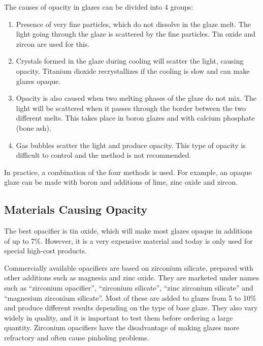 The causes of opacity in glazes can be divided into 4 groups:
\begin{enumerate}
\item Presence of very fine particles, which do not dissolve in the glaze melt. 
The light going through the glaze is scattered by the fine particles. Tin oxide 
 and zircon  are used for this.
\item Crystals formed in the glaze during cooling will scatter the light, 
causing opacity. Titanium dioxide  recrystallizes if the cooling is 
slow and can make glazes opaque.
\item Opacity is also caused when two melting phases of the glaze do not mix. 
The light will be scattered when it passes through the border between the two 
different melts. This takes place in boron glazes and with calcium phosphate 
(bone ash).
\item Gas bubbles scatter the light and produce opacity. This type of opacity 
is difficult to control and the method is not recommended.
\end{enumerate}
In practice, a combination of the four methods is used. For example, an opaque 
glaze can be made with boron and additions of lime, zinc oxide and zircon.
\subsection{Materials Causing Opacity}
The best opacifier is tin oxide, which will make most glazes opaque in 
additions of up to 7\%. However, it is a very expensive material and today is 
only used for special high-cost products.

Commercially available opacifiers are based on zirconium silicate, prepared 
with other additions such as magnesia and zinc oxide. They are marketed under 
names such as ``zirconium opacifier'', ``zirconium silicate'', ``zinc zirconium 
silicate'' and ``magnesium zirconium silicate''. Most of these are added to 
glazes 
from 5 to 10\% and produce different results depending on the type of base 
glaze. They also vary widely in quality, and it is important to test them 
before ordering a large quantity. Zirconium opacifiers have the disadvantage of 
making glazes more refractory and often cause pinholing problems.

